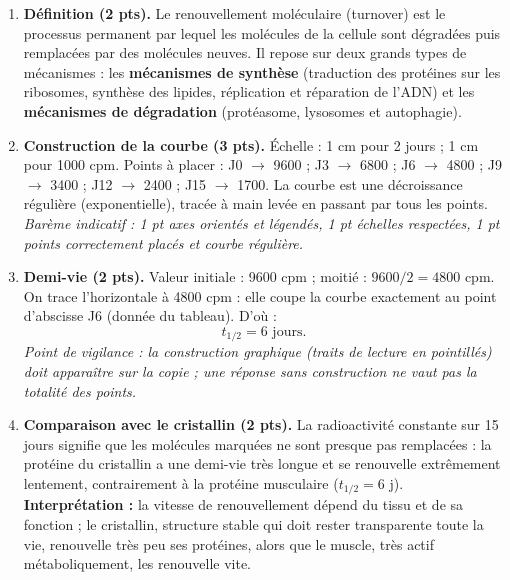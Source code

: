 \documentclass[11pt]{article}
\begin{document}
\begin{corrige}
\begin{enumerate}
\item \textbf{Définition (2 pts).} Le renouvellement moléculaire (turnover) est le processus permanent par lequel les molécules de la cellule sont dégradées puis remplacées par des molécules neuves. Il repose sur deux grands types de mécanismes : les \textbf{mécanismes de synthèse} (traduction des protéines sur les ribosomes, synthèse des lipides, réplication et réparation de l'ADN) et les \textbf{mécanismes de dégradation} (protéasome, lysosomes et autophagie).

\item \textbf{Construction de la courbe (3 pts).} Échelle : 1 cm pour 2 jours ; 1 cm pour 1000 cpm. Points à placer : J0 $\rightarrow$ 9600 ; J3 $\rightarrow$ 6800 ; J6 $\rightarrow$ 4800 ; J9 $\rightarrow$ 3400 ; J12 $\rightarrow$ 2400 ; J15 $\rightarrow$ 1700. La courbe est une décroissance régulière (exponentielle), tracée à main levée en passant par tous les points. \emph{Barème indicatif : 1 pt axes orientés et légendés, 1 pt échelles respectées, 1 pt points correctement placés et courbe régulière.}

\item \textbf{Demi-vie (2 pts).} Valeur initiale : 9600 cpm ; moitié : $9600 / 2 = \num{4800}$ cpm. On trace l'horizontale à 4800 cpm : elle coupe la courbe exactement au point d'abscisse J6 (donnée du tableau). D'où :
\[ t_{1/2} = 6 \text{ jours}. \]
\emph{Point de vigilance : la construction graphique (traits de lecture en pointillés) doit apparaître sur la copie ; une réponse sans construction ne vaut pas la totalité des points.}

\item \textbf{Comparaison avec le cristallin (2 pts).} La radioactivité constante sur 15 jours signifie que les molécules marquées ne sont presque pas remplacées : la protéine du cristallin a une demi-vie très longue et se renouvelle extrêmement lentement, contrairement à la protéine musculaire ($t_{1/2} = 6$ j). \textbf{Interprétation :} la vitesse de renouvellement dépend du tissu et de sa fonction ; le cristallin, structure stable qui doit rester transparente toute la vie, renouvelle très peu ses protéines, alors que le muscle, très actif métaboliquement, les renouvelle vite.


\end{enumerate}
\end{corrige}
\end{document}
